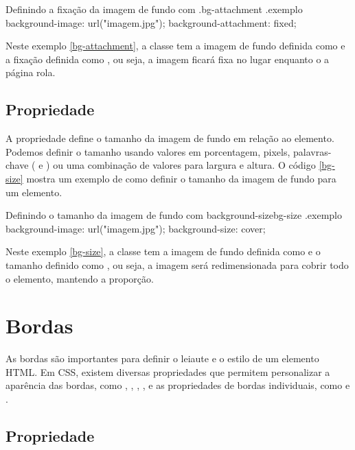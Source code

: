 \begin{csscode}{Definindo a fixação da imagem de fundo com .}{bg-attachment}
.exemplo {
    background-image: url("imagem.jpg");
    background-attachment: fixed;
}
\end{csscode}

Neste exemplo \ref{bg-attachment}, a classe  tem a imagem de fundo definida como  e a fixação definida como , ou seja, a imagem ficará fixa no lugar enquanto o a página rola.

\subsection{Propriedade }

A propriedade  define o tamanho da imagem de fundo em relação ao elemento. Podemos definir o tamanho usando valores em porcentagem, pixels, palavras-chave ( e ) ou uma combinação de valores para largura e altura. O código \ref{bg-size} mostra um exemplo de como definir o tamanho da imagem de fundo para um elemento.

\begin{csscode}{Definindo o tamanho da imagem de fundo com background-size}{bg-size}
.exemplo {
    background-image: url("imagem.jpg");
    background-size: cover;
}
\end{csscode}

Neste exemplo \ref{bg-size}, a classe  tem a imagem de fundo definida como  e o tamanho definido como , ou seja, a imagem será redimensionada para cobrir todo o elemento, mantendo a proporção.

\section{Bordas}

As bordas são importantes para definir o leiaute e o estilo de um elemento HTML. Em CSS, existem diversas propriedades que permitem personalizar a aparência das bordas, como , , , , e as propriedades de bordas individuais, como  e .

\subsection{Propriedade }

